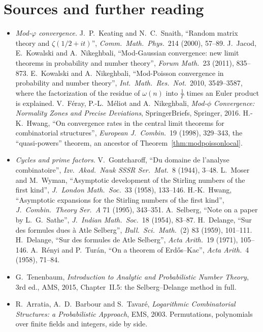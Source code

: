 \section*{Sources and further reading}

\begin{itemize}
\item \emph{Mod-$\varphi$ convergence.} J.~P.~Keating and N.~C.~Snaith, ``Random matrix theory and $\zeta(1/2+it)$'', \emph{Comm.\ Math.\ Phys.}\ 214 (2000), 57--89. J.~Jacod, E.~Kowalski and A.~Nikeghbali, ``Mod-Gaussian convergence: new limit theorems
in probability and number theory'', \emph{Forum Math.}\ 23 (2011), 835--873. E.~Kowalski and A.~Nikeghbali, ``Mod-Poisson convergence in probability and number theory'', \emph{Int.\ Math.\ Res.\ Not.}\ 2010, 3549--3587, where the factorization of the residue
of $\omega(n)$ into $\frac1\Gamma$ times an Euler product is explained. V.~F\'eray, P.-L.~M\'eliot and A.~Nikeghbali, \emph{Mod-$\phi$ Convergence: Normality Zones and Precise Deviations}, SpringerBriefs, Springer, 2016. H.-K.~Hwang, ``On convergence rates in the central limit
theorems for combinatorial structures'', \emph{European J.\ Combin.}\ 19 (1998), 329--343, the ``quasi-powers'' theorem, an ancestor of Theorem~\ref{thm:modpoissonlocal}.
\item \emph{Cycles and prime factors.} V.~Gontcharoff, ``Du domaine de l'analyse combinatoire'', \emph{Izv.\ Akad.\ Nauk SSSR Ser.\ Mat.}\ 8 (1944), 3--48. L.~Moser and M.~Wyman, ``Asymptotic development of the Stirling numbers of the first kind'', \emph{J.\ London Math.\ Soc.}\ 33 (1958), 133--146. H.-K.~Hwang, ``Asymptotic expansions for the Stirling numbers of the first kind'', \emph{J.\ Combin.\ Theory Ser.\ A} 71 (1995), 343--351.
A.~Selberg, ``Note on a paper by L.~G.~Sathe'', \emph{J.\ Indian Math.\ Soc.}\ 18 (1954), 83--87. H.~Delange, ``Sur des formules dues \`a Atle Selberg'', \emph{Bull.\ Sci.\ Math.}\ (2) 83 (1959), 101--111. H.~Delange, ``Sur des formules de Atle Selberg'', \emph{Acta Arith.}\ 19 (1971), 105--146. A.~R\'enyi and P.~Tur\'an, ``On a theorem of Erd\H os--Kac'', \emph{Acta Arith.}\ 4 (1958), 71--84.
\item G.~Tenenbaum, \emph{Introduction to Analytic and Probabilistic Number Theory}, 3rd ed., AMS, 2015, Chapter~II.5: the Selberg--Delange method in full.
\item R.~Arratia, A.~D.~Barbour and S.~Tavar\'e, \emph{Logarithmic Combinatorial Structures: a Probabilistic Approach}, EMS, 2003. Permutations, polynomials over finite fields and integers, side by side.
\end{itemize}
